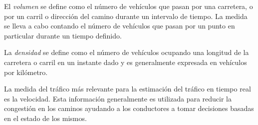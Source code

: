 El \emph{volumen} se define como el número de vehículos que pasan por una carretera, o por un carril o dirección del camino durante un intervalo de tiempo. La medida se lleva a cabo contando el número de vehículos que pasan por un punto en particular durante un tiempo definido.

La \emph{densidad} se define como el número de vehículos ocupando una longitud de la carretera o carril en un instante dado y es generalmente expresada en vehículos por kilómetro.

La medida del tráfico más relevante para la estimación del tráfico en tiempo real es la velocidad. Esta información generalmente es utilizada para reducir la congestión en los caminos ayudando a los conductores a tomar decisiones basadas en el estado de los mismos.